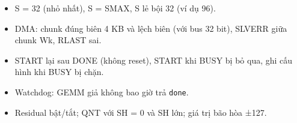 \documentclass[11pt,a4paper]{article}
\renewcommand{\_}{\oldus\allowbreak}
\providecommand{\tightlist}{\setlength{\itemsep}{0pt}\setlength{\parskip}{0pt}}
\begin{document}
\begin{itemize}
\tightlist
\item
  S = 32 (nhỏ nhất), S = S\_MAX, S lẻ bội 32 (ví dụ 96).
\item
  DMA: chunk đúng biên 4 KB và lệch biên (với bus 32 bit), SLVERR giữa
  chunk Wk, RLAST sai.
\item
  START lại sau DONE (không reset), START khi BUSY bị bỏ qua, ghi cấu
  hình khi BUSY bị chặn.
\item
  Watchdog: GEMM giả không bao giờ trả \texttt{done}.
\item
  Residual bật/tắt; QNT với SH = 0 và SH lớn; giá trị bão hòa ±127.
\end{itemize}
\end{document}
